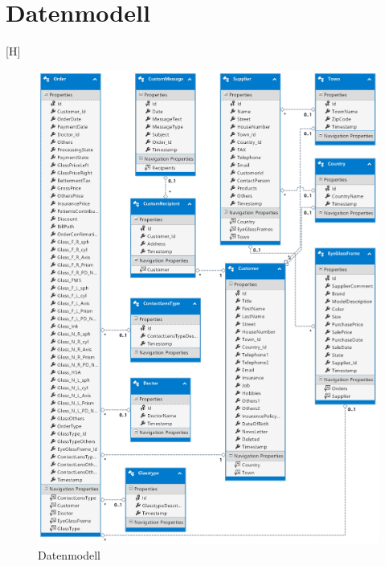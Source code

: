 \section{Datenmodell}[H]
\begin{figure}
\begin{center}
	\includegraphics[scale=1.05]{images/db.png}
\end{center}
	\caption{Datenmodell}
	\label{fig:sample}
\end{figure}
